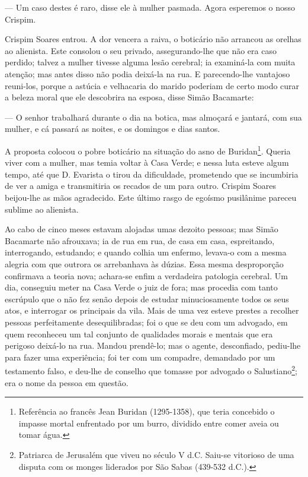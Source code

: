 --- Um caso destes é raro, disse ele à mulher pasmada. Agora esperemos o
nosso Crispim.

Crispim Soares entrou. A dor vencera a raiva, o boticário não arrancou
as orelhas ao alienista. Este consolou o seu privado, assegurando-lhe
que não era caso perdido; talvez a mulher tivesse alguma lesão cerebral;
ia examiná-la com muita atenção; mas antes disso não podia deixá-la na
rua. E parecendo-lhe vantajoso reuni-los, porque a astúcia e velhacaria
do marido poderiam de certo modo curar a beleza moral que ele descobrira
na esposa, disse Simão Bacamarte:

--- O senhor trabalhará durante o dia na botica, mas almoçará e jantará,
com sua mulher, e cá passará as noites, e os domingos e dias santos.

A proposta colocou o pobre boticário na situação do asno de
Buridan\footnote{Referência ao francês Jean Buridan (1295-1358), que
  teria concebido o impasse mortal enfrentado por um burro, dividido
  entre comer aveia ou tomar água.}. Queria viver com a mulher, mas
temia voltar à Casa Verde; e nessa luta esteve algum tempo, até que D.
Evarista o tirou da dificuldade, prometendo que se incumbiria de ver a
amiga e transmitiria os recados de um para outro. Crispim Soares
beijou-lhe as mãos agradecido. Este último rasgo de egoísmo pusilânime
pareceu sublime ao alienista.

Ao cabo de cinco meses estavam alojadas umas dezoito pessoas; mas Simão
Bacamarte não afrouxava; ia de rua em rua, de casa em casa, espreitando,
interrogando, estudando; e quando colhia um enfermo, levava-o com a
mesma alegria com que outrora os arrebanhava às dúzias. Essa mesma
desproporção confirmava a teoria nova; achara-se enfim a verdadeira
patologia cerebral. Um dia, conseguiu meter na Casa Verde o juiz de
fora; mas procedia com tanto escrúpulo que o não fez senão depois de
estudar minuciosamente todos os seus atos, e interrogar os principais da
vila. Mais de uma vez esteve prestes a recolher pessoas perfeitamente
desequilibradas; foi o que se deu com um advogado, em quem reconheceu um
tal conjunto de qualidades morais e mentais que era perigoso deixá-lo na
rua. Mandou prendê-lo; mas o agente, desconfiado, pediu-lhe para fazer
uma experiência; foi ter com um compadre, demandado por um testamento
falso, e deu-lhe de conselho que tomasse por advogado o
Salustiano\footnote{Patriarca de Jerusalém que viveu no século V d.C.
  Saiu-se vitorioso de uma disputa com os monges liderados por São Sabas
  (439-532 d.C.).}; era o nome da pessoa em questão.

